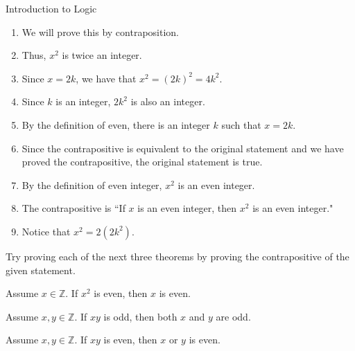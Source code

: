 \begin{section}{Introduction to Logic}
\begin{problem}
\begin{enumerate}
\item We will prove this by contraposition.
\item Thus, $x^2$ is twice an integer.
\item Since $x=2k$, we have that $x^2 =(2k)^2 =4k^2$.
\item Since $k$ is an integer, $2k^2$ is also an integer.
\item By the definition of even, there is an integer $k$ such that $x=2k$.
\item Since the contrapositive is equivalent to the original statement and we have proved the contrapositive, the original statement is true.
\item By the definition of even integer, $x^2$ is an even integer.
\item The contrapositive is ``If $x$ is an even integer, then $x^2$ is an even integer."
\item Notice that $x^2 = 2(2k^2)$.
\end{enumerate}
\end{problem}

Try proving each of the next three theorems by proving the contrapositive of the given statement.

\begin{theorem}
Assume $x\in\mathbb{Z}$. If $x^2$ is even, then $x$ is even.
\end{theorem}

\begin{theorem}
Assume $x,y\in\mathbb{Z}$.  If $xy$ is odd, then both $x$ and $y$ are odd.
\end{theorem}

\begin{theorem}
Assume $x,y\in\mathbb{Z}$.  If $xy$ is even, then $x$ or $y$ is even.
\end{theorem}

\end{section}